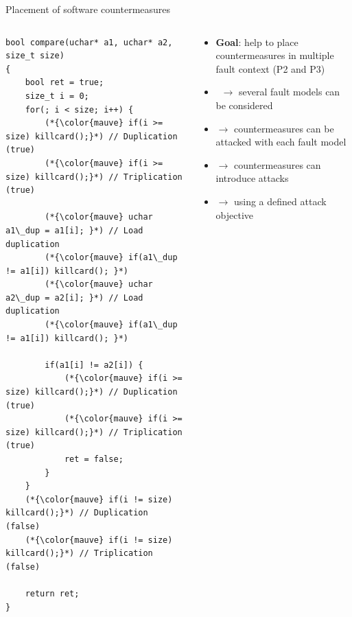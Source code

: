 \begin{frame}{Placement of software countermeasures}
    \begin{columns}
        \begin{column}{0.55\textwidth}
            \begin{lstlisting}
bool compare(uchar* a1, uchar* a2, size_t size)
{
    bool ret = true;
    size_t i = 0; 
    for(; i < size; i++) {
        (*{\color{mauve} if(i >= size) killcard();}*) // Duplication (true)
        (*{\color{mauve} if(i >= size) killcard();}*) // Triplication (true)

        (*{\color{mauve} uchar a1\_dup = a1[i]; }*) // Load duplication
        (*{\color{mauve} if(a1\_dup != a1[i]) killcard(); }*)
        (*{\color{mauve} uchar a2\_dup = a2[i]; }*) // Load duplication
        (*{\color{mauve} if(a1\_dup != a1[i]) killcard(); }*) 
        
        if(a1[i] != a2[i]) {
            (*{\color{mauve} if(i >= size) killcard();}*) // Duplication (true)
            (*{\color{mauve} if(i >= size) killcard();}*) // Triplication (true)
            ret = false;
        }
    }
    (*{\color{mauve} if(i != size) killcard();}*) // Duplication (false)
    (*{\color{mauve} if(i != size) killcard();}*) // Triplication (false)
        
    return ret;
}
            \end{lstlisting}	
            \vfill
        \end{column}
        \begin{column}{0.55\textwidth}
    	   \begin{small}
                 \begin{itemize}
                     \item \textbf{Goal}: help to place countermeasures in multiple fault context (P2 and P3)
                     \item[] $\rightarrow$ several fault models can be considered
                     \item[] $\rightarrow$ countermeasures can be attacked with each fault model
                     \item[] $\rightarrow$ countermeasures can introduce attacks
                     \item[] $\rightarrow$ using a defined attack objective
                 \end{itemize}
    	   \end{small}
            \vfill
        \end{column}
    \end{columns}
\end{frame}


